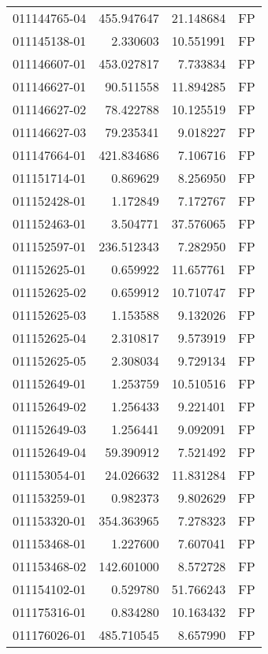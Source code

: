 \begin{tabular}{lrrl}
011144765-04 &  455.947647 &      21.148684 &   FP \\
011145138-01 &    2.330603 &      10.551991 &   FP \\
011146607-01 &  453.027817 &       7.733834 &   FP \\
011146627-01 &   90.511558 &      11.894285 &   FP \\
011146627-02 &   78.422788 &      10.125519 &   FP \\
011146627-03 &   79.235341 &       9.018227 &   FP \\
011147664-01 &  421.834686 &       7.106716 &   FP \\
011151714-01 &    0.869629 &       8.256950 &   FP \\
011152428-01 &    1.172849 &       7.172767 &   FP \\
011152463-01 &    3.504771 &      37.576065 &   FP \\
011152597-01 &  236.512343 &       7.282950 &   FP \\
011152625-01 &    0.659922 &      11.657761 &   FP \\
011152625-02 &    0.659912 &      10.710747 &   FP \\
011152625-03 &    1.153588 &       9.132026 &   FP \\
011152625-04 &    2.310817 &       9.573919 &   FP \\
011152625-05 &    2.308034 &       9.729134 &   FP \\
011152649-01 &    1.253759 &      10.510516 &   FP \\
011152649-02 &    1.256433 &       9.221401 &   FP \\
011152649-03 &    1.256441 &       9.092091 &   FP \\
011152649-04 &   59.390912 &       7.521492 &   FP \\
011153054-01 &   24.026632 &      11.831284 &   FP \\
011153259-01 &    0.982373 &       9.802629 &   FP \\
011153320-01 &  354.363965 &       7.278323 &   FP \\
011153468-01 &    1.227600 &       7.607041 &   FP \\
011153468-02 &  142.601000 &       8.572728 &   FP \\
011154102-01 &    0.529780 &      51.766243 &   FP \\
011175316-01 &    0.834280 &      10.163432 &   FP \\
011176026-01 &  485.710545 &       8.657990 &   FP \\

\end{tabular}
